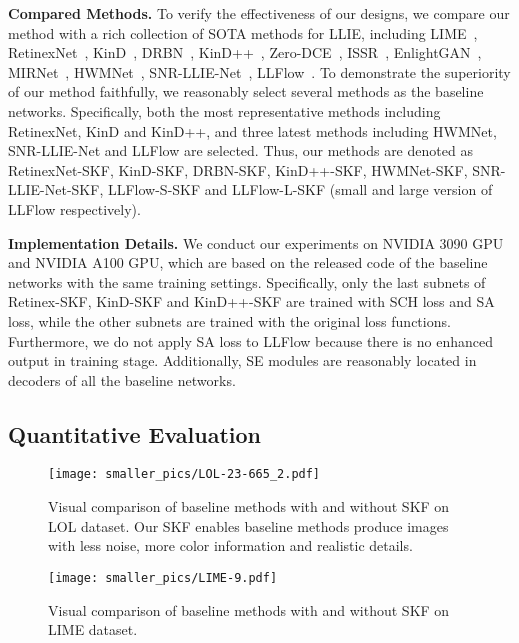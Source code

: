 \documentclass[10pt,twocolumn,letterpaper]{article}
\begin{document}
\vspace{-0.01cm}
\textbf{Compared Methods.} To verify the effectiveness of our designs, we compare our method with a rich collection of SOTA methods for LLIE, including LIME~\cite{guo2016lime}, RetinexNet~\cite{Chen2018Retinex}, KinD~\cite{zhang2019kind}, DRBN~\cite{yang2020drbn}, KinD++~\cite{zhang2021kindplus}, Zero-DCE~\cite{guo2020zerodce}, ISSR~\cite{fan2020integrating}, EnlightGAN~\cite{jiang2021enlightengan}, MIRNet~\cite{zamir2022mirnetv2}, HWMNet~\cite{fan2022hwmnet}, SNR-LLIE-Net~\cite{xu2022snr}, LLFlow~\cite{wang2022llflow}. To demonstrate the superiority of our method faithfully, we reasonably select several methods as the baseline networks. Specifically, both the most representative methods including RetinexNet, KinD and KinD++, and three latest methods including HWMNet, SNR-LLIE-Net and LLFlow are selected. Thus, our methods are denoted as RetinexNet-SKF, KinD-SKF, DRBN-SKF, KinD++-SKF, HWMNet-SKF, SNR-LLIE-Net-SKF, LLFlow-S-SKF and LLFlow-L-SKF (small and large version of LLFlow respectively). 

\vspace{-0.01cm}
\textbf{Implementation Details.} We conduct our experiments on NVIDIA 3090 GPU and NVIDIA A100 GPU, which are based on the released code of the baseline networks with the same training settings. Specifically, only the last subnets of Retinex-SKF, KinD-SKF and KinD++-SKF are trained with SCH loss and SA loss, while the other subnets are trained with the original loss functions. Furthermore, we do not apply SA loss to LLFlow because there is no enhanced output in training stage. Additionally, SE modules are reasonably located in decoders of all the baseline networks.

\vspace{-0.17cm}
\subsection{Quantitative Evaluation}
\begin{figure*}[t]
  \centering
   \texttt{[image: smaller\_pics/LOL-23-665\_2.pdf]}
   \setlength{\abovecaptionskip}{-0.4cm}
   \setlength{\belowcaptionskip}{-0.3cm}
   \caption{Visual comparison of baseline methods with and without SKF on LOL dataset. Our SKF enables baseline methods produce images with less noise, more color information and realistic details.}
   \label{fig:LOL_vis}
\end{figure*}

\begin{figure*}[t]
  \centering
   \texttt{[image: smaller\_pics/LIME-9.pdf]}
   \setlength{\abovecaptionskip}{-0.4cm}
   \setlength{\belowcaptionskip}{-0.6cm}
   \caption{Visual comparison of baseline methods with and without SKF on LIME dataset.}
   \label{fig:LIME_vis}
\end{figure*}
\end{document}
